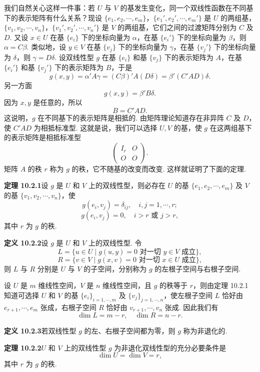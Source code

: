 \documentclass[UTF8,12pt,a4paper,fontset=fandol]{ctexart}
\begin{document}
我们自然关心这样一件事：若 $U$ 与 $V$ 的基发生变化，同一个双线性函数在不同基下的表示矩阵有什么关系？现设 $\{e_1,e_2,\cdots,e_m\}$，$\{e_1',e_2',\cdots,e_m'\}$ 是 $U$ 的两组基，$\{v_1,v_2,\cdots,v_n\}$，$\{v_1',v_2',\cdots,v_n'\}$ 是 $V$ 的两组基，它们之间的过渡矩阵分别为 $C$ 及 $D$. 又设 $x\in U$ 在基 $\{e_i\}$ 下的坐标向量为 $\alpha$，在基 $\{e_i'\}$ 下的坐标向量为 $\beta$，则 $\alpha=C\beta$. 类似地，设 $y\in V$ 在基 $\{v_j\}$ 下的坐标向量为 $\gamma$，在基 $\{v_j'\}$ 下的坐标向量为 $\delta$，则 $\gamma=D\delta$. 设双线性型 $g$ 在基 $\{e_i\}$ 和基 $\{v_j\}$ 下的表示矩阵为 $A$，在基 $\{e_i'\}$ 和基 $\{v_j'\}$ 下的表示矩阵为 $B$，于是
\[
  g(x,y)=\alpha' A\gamma=(C\beta)'A(D\delta)=\beta'(C'AD)\delta.
\]
另一方面
\[
  g(x,y)=\beta'B\delta.
\]
因为 $x,y$ 是任意的，所以
\[
  B=C'AD.
\]
这说明，$g$ 在不同基下的表示矩阵是相抵的. 由矩阵理论知道存在非异阵 $C$ 及 $D$，使 $C'AD$ 为相抵标准型. 这就是说，我们可以选择 $U,V$ 的基，使 $g$ 在这两组基下的表示矩阵是相抵标准型
\[
  \left(\begin{array}{cc}
  I_r&O\\
  O&O
  \end{array}\right).
\]
矩阵 $A$ 的秩 $r$ 称为 $g$ 的秩，它不随基的改变而改变. 这样就证明了下面的定理.

\noindent\textbf{定理 10.2.1}\quad 设 $g$ 是 $U$ 和 $V$ 上的双线性型，则必存在 $U$ 的基 $\{e_1,e_2,\cdots,e_m\}$ 及 $V$ 的基 $\{v_1,v_2,\cdots,v_n\}$，使
\[
  g(e_i,v_j)=\delta_{ij},\quad i,j=1,\cdots,r;
\]
\[
  g(e_i,v_j)=0,\quad i>r\text{ 或 }j>r,
\]
其中 $r$ 为 $g$ 的秩.

\noindent\textbf{定义 10.2.2}\quad 设 $g$ 是 $U$ 和 $V$ 上的双线性型. 令
\[
  L=\{u\in U\mid g(u,y)=0\text{ 对一切 }y\in V\text{ 成立}\},
\]
\[
  R=\{v\in V\mid g(x,v)=0\text{ 对一切 }x\in U\text{ 成立}\},
\]
则 $L$ 与 $R$ 分别是 $U$ 与 $V$ 的子空间，分别称为 $g$ 的左根子空间与右根子空间.

设 $U$ 是 $m$ 维线性空间，$V$ 是 $n$ 维线性空间，且 $g$ 的秩等于 $r$，则由定理 10.2.1 知道可选择 $U$ 和 $V$ 的基 $\{e_i\}_{i=1,\cdots,m}$ 及 $\{v_j\}_{j=1,\cdots,n}$，使左根子空间 $L$ 恰好由 $e_{r+1},\cdots,e_m$ 张成，右根子空间 $R$ 恰好由 $v_{r+1},\cdots,v_n$ 张成. 因此我们有
\begin{equation}
  \dim L=m-r,\quad \dim R=n-r.
  \tag{10.2.3}
\end{equation}

\noindent\textbf{定义 10.2.3}\quad 若双线性型 $g$ 的左、右根子空间都为零，则 $g$ 称为非退化的.

\noindent\textbf{定理 10.2.2}\quad $U$ 和 $V$ 上的双线性型 $g$ 为非退化双线性型的充分必要条件是
\[
  \dim U=\dim V=r,
\]
其中 $r$ 为 $g$ 的秩.
\end{document}
